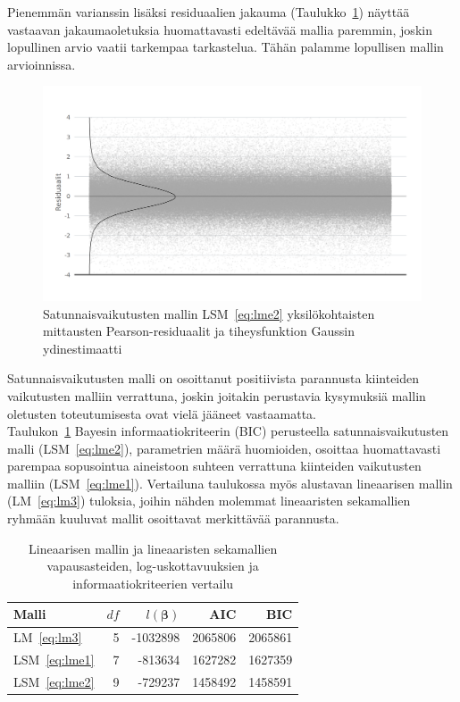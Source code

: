 \documentclass[finnish]{docopts}
\begin{document}
Pienemmän varianssin lisäksi residuaalien jakauma (Taulukko~\ref{fig:lme2_resid}) näyttää vastaavan jakaumaoletuksia huomattavasti edeltävää mallia paremmin, joskin lopullinen arvio vaatii tarkempaa tarkastelua. Tähän palamme lopullisen mallin arvioinnissa.\\

\begin{figure}[H]
\centering
  \includegraphics[scale=0.8]{kuvaajat/lme2_residuaalit.png}
  \caption{Satunnaisvaikutusten mallin LSM~\ref{eq:lme2} yksilökohtaisten mittausten Pearson-residuaalit ja tiheysfunktion Gaussin ydinestimaatti}
  \label{fig:lme2_resid}
\end{figure}

Satunnaisvaikutusten malli on osoittanut positiivista parannusta kiinteiden vaikutusten malliin verrattuna, joskin joitakin perustavia kysymuksiä mallin oletusten toteutumisesta ovat vielä jääneet vastaamatta.\\

Taulukon~\ref{table:lme_summary} Bayesin informaatiokriteerin (BIC) perusteella satunnaisvaikutusten malli (LSM~\ref{eq:lme2}), parametrien määrä huomioiden, osoittaa huomattavasti parempaa sopusointua aineistoon suhteen verrattuna kiinteiden vaikutusten malliin (LSM~\ref{eq:lme1}). Vertailuna taulukossa myös alustavan lineaarisen mallin (LM~\ref{eq:lm3}) tuloksia, joihin nähden molemmat lineaaristen sekamallien ryhmään kuuluvat mallit osoittavat merkittävää parannusta. \\

\begin{table}[H]
\centering
\begin{tabular}{lrrrr}
\toprule
Malli & $df$ & $l(\bm{\beta})$ & AIC & BIC\\
\midrule
LM~\ref{eq:lm3} & 5 & -1032898 & 2065806 & 2065861\\
LSM~\ref{eq:lme1} & 7 & -813634 & 1627282 & 1627359\\
LSM~\ref{eq:lme2} & 9 & -729237 & 1458492 & 1458591\\
\bottomrule
\end{tabular}
\caption{Lineaarisen mallin ja lineaaristen sekamallien vapausasteiden, log-uskottavuuksien ja informaatiokriteerien vertailu}
\label{table:lme_summary}
\end{table}
\end{document}
